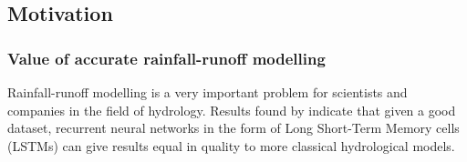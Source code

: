 \subsection{Motivation}
\subsubsection{Value of accurate rainfall-runoff modelling}
Rainfall-runoff modelling is a very important problem for scientists and 
companies in the field of hydrology.
Results found by \cite{lstm_first_paper} indicate that given a good dataset, recurrent neural networks in the form of Long Short-Term Memory cells (LSTMs) can give results equal in quality to more classical hydrological models.
\cite{lstm_second_paper}
\cite{lstm_third_paper}
